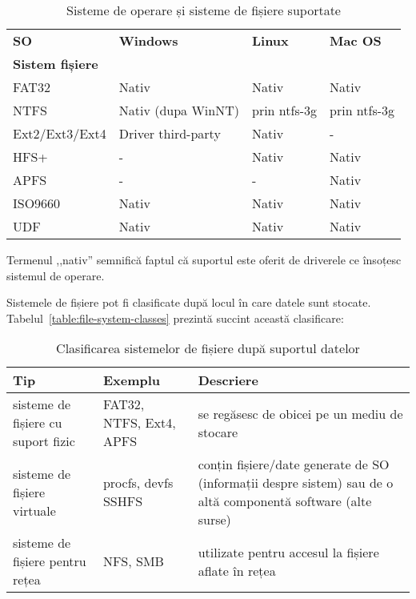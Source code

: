 \begin{table}[htb]
\caption{Sisteme de operare și sisteme de fișiere suportate}
\begin{center}
	\begin{tabular}{ p{} p{} p{} p{} }
	\toprule
		\textbf{SO} & \textbf{Windows} & \textbf{Linux} & \textbf{Mac OS} \\
		\textbf{Sistem fișiere} & & & \\
	\midrule
		FAT32 & Nativ & Nativ & Nativ \\
	\midrule
		NTFS & Nativ (dupa WinNT) & prin ntfs-3g & prin ntfs-3g \\
	\midrule
		Ext2/Ext3/Ext4 & Driver third-party & Nativ & - \\
	\midrule
		HFS+ & - & Nativ & Nativ \\
        \midrule
                APFS & - & - & Nativ \\
	\midrule
		ISO9660 & Nativ & Nativ & Nativ \\
	\midrule
		UDF & Nativ & Nativ & Nativ \\
	\bottomrule
	\end{tabular}
	\label{table:file-system-backup-fs-types}
\end{center}
\end{table}

Termenul ,,nativ'' semnifică faptul că suportul este oferit de driverele ce
însoțesc sistemul de operare.

Sistemele de fișiere pot fi clasificate după locul în care datele sunt stocate. Tabelul~\ref{table:file-system-classes} prezintă succint această clasificare:

\begin{table}[htb]
\caption{Clasificarea sistemelor de fișiere după suportul datelor}
\begin{center}
	\begin{tabular}{ p{} p{} p{} }
	\toprule
		\textbf{Tip} & \textbf{Exemplu} & \textbf{Descriere} \\
	\midrule
		sisteme de fișiere cu suport fizic & 	FAT32, NTFS, Ext4, APFS & se
		regăsesc de obicei pe un mediu de stocare \\
	\midrule
		sisteme de fișiere virtuale & procfs, devfs SSHFS & conțin fișiere/date generate
		de SO (informații despre sistem) sau de o altă componentă software (alte surse) \\
	\midrule
		sisteme de fișiere pentru rețea & NFS, SMB & utilizate pentru accesul la
		fișiere aflate în rețea \\
	\bottomrule
	\end{tabular}
	\label{table:file-system-fs-classes}
\end{center}
\end{table}

